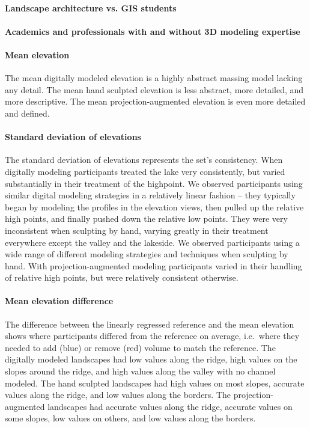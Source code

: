 \documentclass[prodmode,acmtochi]{acmsmall} %
\begin{document}
\paragraph{Landscape architecture vs. GIS students}


\paragraph{Academics and professionals with and without 3D modeling expertise}


\paragraph{Mean elevation}
The mean digitally modeled elevation is a highly abstract massing model
lacking any detail. 
% 
The mean hand sculpted elevation 
is less abstract, more detailed, and more descriptive.
%
The mean projection-augmented elevation 
is even more detailed and defined. 

\paragraph{Standard deviation of elevations}
The standard deviation of elevations represents the set's consistency.
%
When digitally modeling 
participants treated the lake very consistently, but 
varied substantially in their treatment of the highpoint.
%
We observed participants 
using similar digital modeling strategies 
in a relatively linear fashion -- 
they typically began by modeling the profiles in the elevation views,
then pulled up the relative high points, 
and finally pushed down the relative low points. 
They were very inconsistent 
when sculpting by hand,
varying greatly in their treatment 
everywhere except the valley and the lakeside.
%
We observed participants using 
a wide range of different modeling strategies
and techniques
when sculpting by hand. 
%
With projection-augmented modeling 
participants varied in their handling of relative high points, 
but were relatively consistent otherwise. 

\paragraph{Mean elevation difference}
The difference between the linearly regressed reference and the mean elevation
shows where participants 
differed from the reference on average, i.e.~where they 
needed to add (blue) or remove (red) volume to match the reference. 
%
The digitally modeled landscapes 
had low values along the ridge,
high values on the slopes around the ridge,
and high values along the valley
with no channel modeled.
% 
The hand sculpted landscapes 
had high values on most slopes,
accurate values along the ridge, 
and low values along the borders.
%
The projection-augmented landscapes 
had accurate values along the ridge,
accurate values on some slopes, 
low values on others, 
and low values along the borders.
\end{document}
